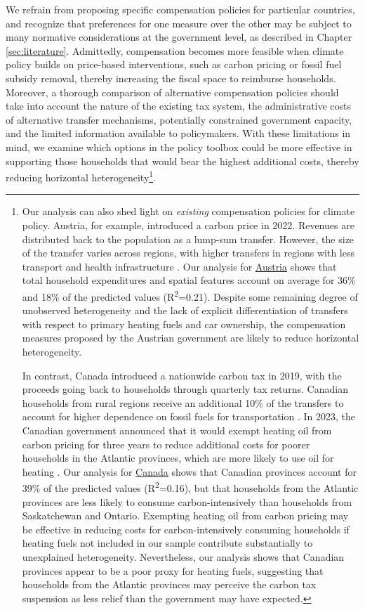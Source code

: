 \documentclass[12pt, a4paper]{article}
\begin{document}
We refrain from proposing specific compensation policies for particular countries, and recognize that preferences for one measure over the other may be subject to many normative considerations at the government level, as described in Chapter \ref{sec:literature}. Admittedly, compensation becomes more feasible when climate policy builds on price-based interventions, such as carbon pricing or fossil fuel subsidy removal, thereby increasing the fiscal space to reimburse households. Moreover, a thorough comparison of alternative compensation policies should take into account the nature of the existing tax system, the administrative costs of alternative transfer mechanisms, potentially constrained government capacity, and the limited information available to policymakers. With these limitations in mind, we examine which options in the policy toolbox could be more effective in supporting those households that would bear the highest additional costs, thereby reducing horizontal heterogeneity\footnote{Our analysis can also shed light on \textit{existing} compensation policies for climate policy. Austria, for example, introduced a carbon price in 2022. Revenues are distributed back to the population as a lump-sum transfer. However, the size of the transfer varies across regions, with higher transfers in regions with less transport and health infrastructure \autocite{BMK.2023}. Our analysis for \hyperref[fig:5b_AUT]{Austria} shows that total household expenditures and spatial features account on average for 36\% and 18\% of the predicted values (R\textsuperscript{2}=0.21). Despite some remaining degree of unobserved heterogeneity and the lack of explicit differentiation of transfers with respect to primary heating fuels and car ownership, the compensation measures proposed by the Austrian government are likely to reduce horizontal heterogeneity.

In contrast, Canada introduced a nationwide carbon tax in 2019, with the proceeds going back to households through quarterly tax returns. Canadian households from rural regions receive an additional 10\% of the transfers to account for higher dependence on fossil fuels for transportation \autocite{GovernmentofCanada.2023}. In 2023, the Canadian government announced that it would exempt heating oil from carbon pricing for three years to reduce additional costs for poorer households in the Atlantic provinces, which are more likely to use oil for heating \autocite{Reuters.2023}. Our analysis for \hyperref[fig:5b_CAN]{Canada} shows that Canadian provinces account for 39\% of the predicted values (R\textsuperscript{2}=0.16), but that households from the Atlantic provinces are less likely to consume carbon-intensively than households from Saskatchewan and Ontario. Exempting heating oil from carbon pricing may be effective in reducing costs for carbon-intensively consuming households if heating fuels not included in our sample contribute substantially to unexplained heterogeneity. Nevertheless, our analysis shows that Canadian provinces appear to be a poor proxy for heating fuels, suggesting that households from the Atlantic provinces may perceive the carbon tax suspension as less relief than the government may have expected.}.
\end{document}
